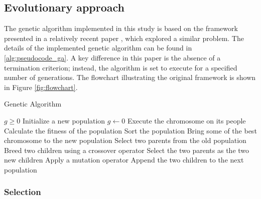 

\subsection{Evolutionary approach}

The genetic algorithm implemented in this study is based on the framework presented in a relatively recent paper \cite{tartan2016flow}, which explored a similar problem. The details of the implemented genetic algorithm can be found in \ref{alg:pseudocode_ga}. A key difference in this paper is the absence of a termination criterion; instead, the algorithm is set to execute for a specified number of generations. The flowchart illustrating the original framework is shown in Figure \ref{fig:flowchart}.

\begin{algorithm}
	\caption{Genetic Algorithm}\label{alg:pseudocode_ga}
	\begin{algorithmic}
		\Require $g \geq 0$
		\State Initialize a new population
		\State $g \gets 0$
		\State Execute the chromosome on its people
		\EndFor
		\State Calculate the fitness of the population
		\State Sort the population
		 
		\State Bring some of the best chromosome to the new population
		\EndIf
		\State Select two parents from the old population
		\State Breed two children using a crossover operator
		\Else
		\State Select the two parents as the two new children
		\EndIf
		\State Apply a mutation operator
		\EndIf
		\EndFor
		\State Append the two children to the next population
		\EndWhile
		\EndWhile
	\end{algorithmic}
\end{algorithm}

\subsubsection{Selection}


